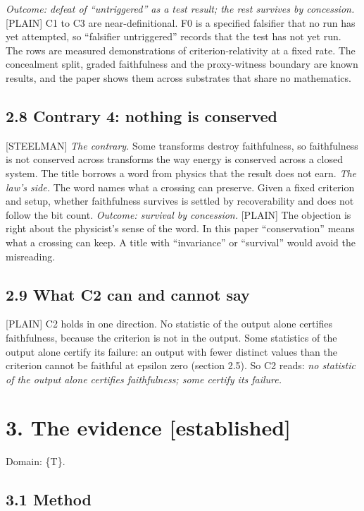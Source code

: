 \documentclass[11pt]{article}
\newcommand{\register}[1]{{\ttfamily\small #1}}
\begin{document}
\emph{Outcome: defeat of ``untriggered'' as a test result; the rest survives by concession.} \register{[PLAIN]} C1 to C3 are near-definitional. F0 is a specified falsifier that no run has yet attempted, so ``falsifier untriggered'' records that the test has not yet run. The rows are measured demonstrations of criterion-relativity at a fixed rate. The concealment split, graded faithfulness and the proxy-witness boundary are known results, and the paper shows them across substrates that share no mathematics.

\subsection*{2.8 Contrary 4: nothing is conserved}

\register{[STEELMAN]} \emph{The contrary.} Some transforms destroy faithfulness, so faithfulness is not conserved across transforms the way energy is conserved across a closed system. The title borrows a word from physics that the result does not earn. \emph{The law's side.} The word names what a crossing can preserve. Given a fixed criterion and setup, whether faithfulness survives is settled by recoverability and does not follow the bit count. \emph{Outcome: survival by concession.} \register{[PLAIN]} The objection is right about the physicist's sense of the word. In this paper ``conservation'' means what a crossing can keep. A title with ``invariance'' or ``survival'' would avoid the misreading.

\subsection*{2.9 What C2 can and cannot say}

\register{[PLAIN]} C2 holds in one direction. No statistic of the output alone certifies faithfulness, because the criterion is not in the output. Some statistics of the output alone certify its failure: an output with fewer distinct values than the criterion cannot be faithful at epsilon zero (section 2.5). So C2 reads: \emph{no statistic of the output alone certifies faithfulness; some certify its failure.}

\section*{3. The evidence [established]}

Domain: \{T\}.

\subsection*{3.1 Method}
\end{document}
